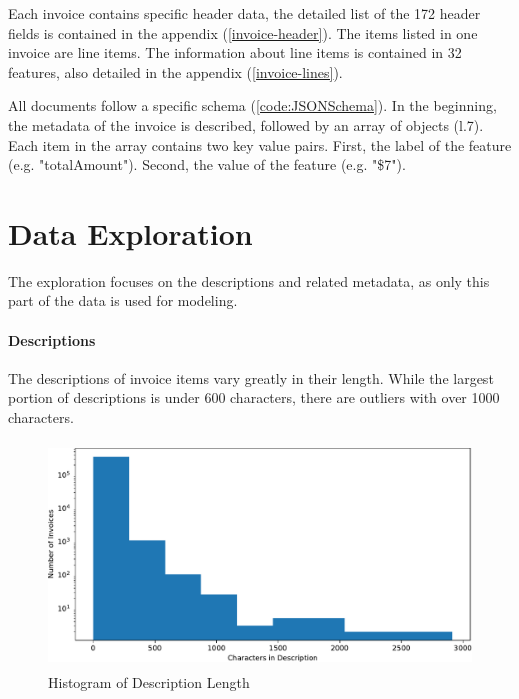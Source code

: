 Each invoice contains specific header data, the detailed list of the 172 header fields is contained in the appendix (\ref{invoice-header}). 
The items listed in one invoice are line items. The information about line items is contained in 32 features, also detailed in the appendix (\ref{invoice-lines}).

All documents follow a specific schema (\ref{code:JSONSchema}). In the beginning, the metadata of the invoice is described, followed by an array of objects (l.7). Each item in the array contains two key value pairs. First, the label of the feature (e.g. "totalAmount"). Second, the value of the feature (e.g. "\$7").






\section{Data Exploration}
The exploration focuses on the descriptions and related metadata, as only this part of the data is used for modeling.
\paragraph{Descriptions}
The descriptions of invoice items vary greatly in their length. While the largest portion of descriptions is under 600 characters, there are outliers with over 1000 characters. 
\begin{figure}[h!]
	\centering
	\includegraphics[height=6cm]{Bilder/hist_description.pdf}
	\caption{Histogram of Description Length}
	\label{fig:languages-bar}
\end{figure}


